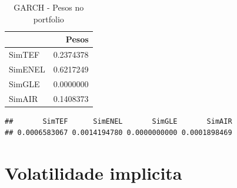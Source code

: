\documentclass[
  12pt,
  a4paper,
  openany]{book}
\newenvironment{Shaded}{\begin{snugshade}}{\end{snugshade}}
\newcommand{\DataTypeTok}[1]{\textcolor[rgb]{0.13,0.29,0.53}{#1}}
\newcommand{\DecValTok}[1]{\textcolor[rgb]{0.00,0.00,0.81}{#1}}
\newcommand{\FloatTok}[1]{\textcolor[rgb]{0.00,0.00,0.81}{#1}}
\newcommand{\KeywordTok}[1]{\textcolor[rgb]{0.13,0.29,0.53}{\textbf{#1}}}
\newcommand{\NormalTok}[1]{#1}
\newcommand{\OperatorTok}[1]{\textcolor[rgb]{0.81,0.36,0.00}{\textbf{#1}}}
\newcommand{\StringTok}[1]{\textcolor[rgb]{0.31,0.60,0.02}{#1}}
\begin{document}
\normalsize

\begin{table}[!h]

\caption{\label{tab:unnamed-chunk-53}GARCH - Pesos no portfolio}
\centering
\begin{tabular}[t]{lr}
\toprule
  & Pesos\\
\midrule
SimTEF & 0.2374378\\
SimENEL & 0.6217249\\
SimGLE & 0.0000000\\
SimAIR & 0.1408373\\
\bottomrule
\end{tabular}
\end{table}

\scriptsize

\begin{Shaded}
\end{Shaded}

\begin{verbatim}
##       SimTEF      SimENEL       SimGLE       SimAIR 
## 0.0006583067 0.0014194780 0.0000000000 0.0001898469
\end{verbatim}

\begin{Shaded}
\end{Shaded}

\normalsize

\hypertarget{volatilidade-implicita}{%
\section{Volatilidade implicita}\label{volatilidade-implicita}}
\end{document}
